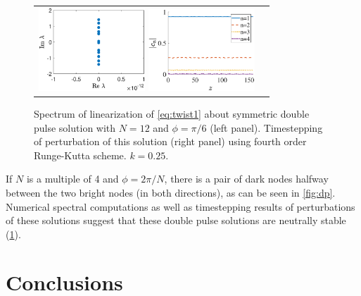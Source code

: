 \documentclass[reprint, amsmath,amssymb,aps]{revtex4-2}
\begin{document}
\begin{figure}
\begin{center}
\begin{tabular}{cc}
\includegraphics[width=4cm]{dp12pi6spec.eps}
\includegraphics[width=4cm]{dp12pi6pert.eps}
\end{tabular}
\end{center}
\caption{Spectrum of linearization of \cref{eq:twist1} about symmetric double pulse solution with $N=12$ and $\phi = \pi/6$ (left panel). Timestepping of perturbation of this solution (right panel) using fourth order Runge-Kutta scheme. $k=0.25$.}
\label{fig:dpstab}
\end{figure}

If $N$ is a multiple of 4 and $\phi = 2\pi/N$, there is a pair of dark nodes halfway between the two bright nodes (in both directions), as can be seen in \cref{fig:dp}. Numerical spectral computations as well as timestepping results of perturbations of these solutions suggest that these double pulse solutions are neutrally stable (\cref{fig:dpstab}).

\section{Conclusions}
\end{document}
